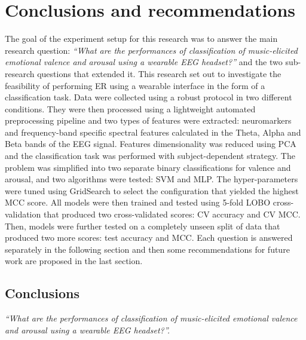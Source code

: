 \chapter{Conclusions and recommendations}
\label{chap:conclusions}
The goal of the experiment setup for this research was to answer the main research question: \emph{“What are the performances of classification of music-elicited emotional valence and arousal using a wearable EEG headset?”} and the two sub-research questions that extended it. This research set out to investigate the feasibility of performing \ac{ER} using a wearable interface in the form of a classification task. Data were collected using a robust protocol in two different conditions. They were then processed using a lightweight automated preprocessing pipeline and two types of features were extracted: neuromarkers and frequency-band specific spectral features calculated in the Theta, Alpha and Beta bands of the \ac{EEG} signal. Features dimensionality was reduced using \ac{PCA} and the classification task was performed with subject-dependent strategy. The problem was simplified into two separate binary classifications for valence and arousal, and two algorithms were tested: \ac{SVM} and \ac{MLP}. The hyper-parameters were tuned using GridSearch to select the configuration that yielded the highest \ac{MCC} score. All models were then trained and tested using 5-fold \ac{LOBO} cross-validation that produced two cross-validated scores: \ac{CV} accuracy and \ac{CV MCC}. Then, models were further tested on a completely unseen split of data that produced two more scores: test accuracy and \ac{MCC}. Each question is answered separately in the following section and then some recommendations for future work are proposed in the last section.
\section{Conclusions}
\emph{“What are the performances of classification of music-elicited emotional valence and arousal using a wearable EEG headset?”. }

